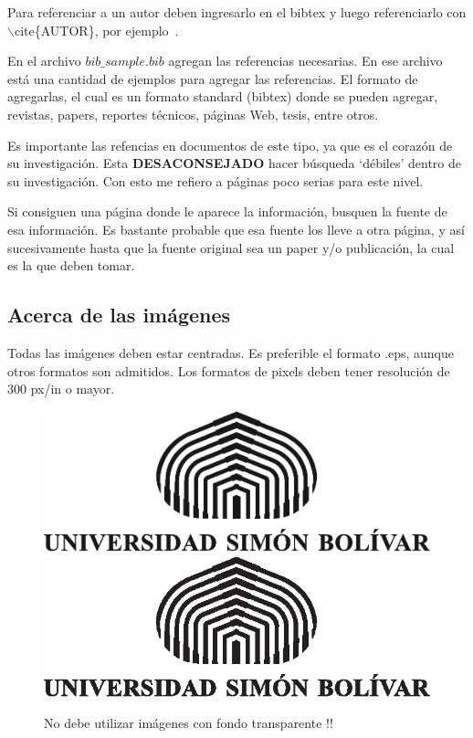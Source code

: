 \documentclass{cgusb}
\numberwithin{equation}{section} %
\begin{document}
Para referenciar a un autor deben ingresarlo en el bibtex y luego referenciarlo con 
$\backslash$cite\{AUTOR\}, por ejemplo~\cite{Lous90}. 

En el archivo $bib\_sample.bib$ agregan las referencias necesarias. En ese archivo está una cantidad de
ejemplos para agregar las referencias. El formato de agregarlas, el cual es un formato standard (bibtex) donde 
se pueden agregar, revistas, papers, reportes técnicos, páginas Web, tesis, entre otros.

Es importante las refencias en documentos de este tipo, ya que es el corazón de su investigación.
Esta \textbf{DESACONSEJADO} hacer búsqueda `débiles' dentro de su investigación. Con esto me 
refiero a páginas poco serias para este nivel.

Si consiguen una página donde le aparece la información, busquen la fuente de esa información. Es bastante 
probable que esa fuente los lleve a otra página, y así sucesivamente hasta que la fuente original sea un paper y/o 
publicación, la cual es la que deben tomar.

\subsection{Acerca de las imágenes}
\label{subsec:tema3}

Todas las imágenes deben estar centradas. Es preferible el formato .eps, aunque otros formatos son admitidos. Los formatos de pixels deben tener resolución de 300 px/in o mayor.

\begin{figure}[htb]
  \centering
	\ifpdf
	  \includegraphics{logotipo.png}
	\else
	  \includegraphics{logotipo.eps}
	\fi
  \caption{\label{fig:primero}
	   No debe utilizar imágenes con fondo transparente !! }
\end{figure}
\end{document}
